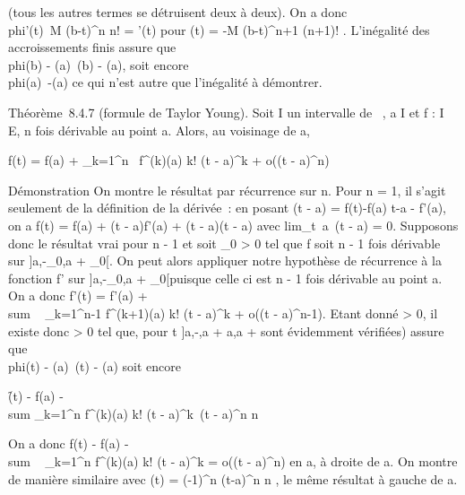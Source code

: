 \documentclass[]{article}
\begin{document}
(tous les autres termes se détruisent deux à deux). On a donc
\\phi'(t)\ \leq M
(b-t)^n \over n! = \psi'(t) pour \psi(t) = -M
(b-t)^n+1 \over (n+1)! . L'inégalité des
accroissements finis assure que \\phi(b) -
\phi(a)\ \leq \psi(b) - \psi(a), soit encore
\\phi(a)\ \leq-\psi(a) ce qui
n'est autre que l'inégalité à démontrer.

Théorème~8.4.7 (formule de Taylor Young). Soit I un intervalle de ~, a \in
I et f : I \rightarrow~ E, n fois dérivable au point a. Alors, au voisinage de a,

f(t) = f(a) + \sum _k=1^n~
f^(k)(a) \over k! (t - a)^k +
o((t - a)^n)

Démonstration On montre le résultat par récurrence sur n. Pour n = 1, il
s'agit seulement de la définition de la dérivée~: en posant \epsilon(t - a) =
f(t)-f(a) \over t-a - f'(a), on a f(t) = f(a) + (t -
a)f'(a) + (t - a)\epsilon(t - a) avec
lim_t\rightarrow~a~\epsilon(t - a) = 0. Supposons donc
le résultat vrai pour n - 1 et soit \eta_0 > 0 tel
que f soit n - 1 fois dérivable sur ]a,-\eta_0,a +
\eta_0[\bigcapI. On peut alors appliquer notre hypothèse de récurrence
à la fonction f' sur ]a,-\eta_0,a + \eta_0[\bigcapI puisque
celle ci est n - 1 fois dérivable au point a. On a donc f'(t) = f'(a)
+ \\sum ~
_k=1^n-1 f^(k+1)(a) \over k!
(t - a)^k + o((t - a)^n-1). Etant donné \epsilon
> 0, il existe donc \eta > 0 tel que, pour t
\in]a,-\eta,a + \eta[\bigcapI, \f'(t) - f'(a)
+ \\sum ~
_k=1^n-1 f^(k+1)(a) \over k!
(t - a)^k\ \leq \epsilont -
a^n-1. Pour t \in]a,a + \eta[, ceci s'écrit encore
\\phi'(t)\ \leq \psi'(t) avec
\phi(t) = f(t) - f(a) -\\\sum
 _k=1^n f^(k)(a) \over
k! (t - a)^k et \psi(t) = \epsilon(t-a)^n
\over n . L'inégalité des accroissements finis (dont
les conditions de validité sur [a,t] sont évidemment vérifiées)
assure que \\phi(t) -
\phi(a)\ \leq \psi(t) - \psi(a) soit encore

\f(t) - f(a) -\\sum
_k=1^n f^(k)(a) \over k!
(t - a)^k\ \leq \epsilon(t - a)^n
\over n

On a donc f(t) - f(a)
-\\sum ~
_k=1^n f^(k)(a) \over k!
(t - a)^k = o((t - a)^n) en a, à droite de a. On
montre de manière similaire avec \psi(t) = (-1)^n
\epsilon(t-a)^n \over n , le même résultat à gauche
de a.
\end{document}
